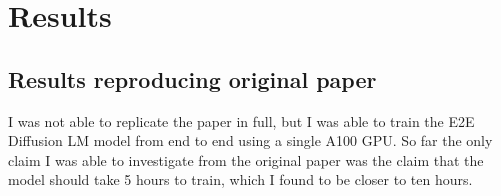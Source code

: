 \section{Results}
\label{sec:results}


\subsection{Results reproducing original paper}

I was not able to replicate the paper in full, but I was able to train the E2E Diffusion LM model from end to end using a single A100 GPU. So far the only claim I was able to investigate from the original paper was the claim that the model should take 5 hours to train, which I found to be closer to ten hours.





 

